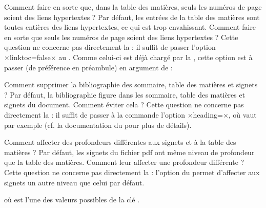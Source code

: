 \begin{dbfaq}{Comment faire en sorte que, dans la table des matières, seuls
    les numéros de page soient des liens hypertextes ?}{}
  Par défaut, les entrées de la table des matières sont toutes entières des
  liens hypertextes, ce qui est trop envahissant. Comment faire en sorte que
  seuls les numéros de page soient des liens hypertextes ?
  \tcblower
  Cette question ne concerne pas directement la \yatcl{} : il suffit de passer
  l'option ×linktoc=false× au . Comme celui-ci est déjà
  chargé par la \yatcl{}, cette option est à passer (de préférence en
  préambule) en argument de  :
\begin{preamblecode}
\hypersetup{linktoc=false}
\end{preamblecode}
\end{dbfaq}

\begin{dbfaq}{Comment supprimer la bibliographie des sommaire, table des
    matières et signets ?}{}
  Par défaut, la bibliographie figure dans les sommaire, table des matières et
  signets du document. Comment éviter cela ?
  \tcblower
  Cette question ne concerne pas directement la \yatcl{} : il suffit de passer
  à la commande  l'option
  ×heading=×, où  vaut par exemple
   (cf. la documentation du  pour
  plus de détails).
\end{dbfaq}

\begin{dbfaq}{Comment affecter des profondeurs différentes aux signets et à la
    table des matières ?}{}
  Par défaut, les signets du fichier \acrshort{pdf} ont même niveau de
  profondeur que la table des matières. Comment leur affecter une profondeur
  différente ?
  \tcblower
  Cette question ne concerne pas directement la \yatcl{} : l'option
   du  permet d'affecter aux
  signets un autre niveau que celui par défaut.
\begin{preamblecode}[title=Par exemple dans le \File{\configurationfile}]
\end{preamblecode}
où  est l'une des valeurs possibles de la clé
.
\end{dbfaq}

